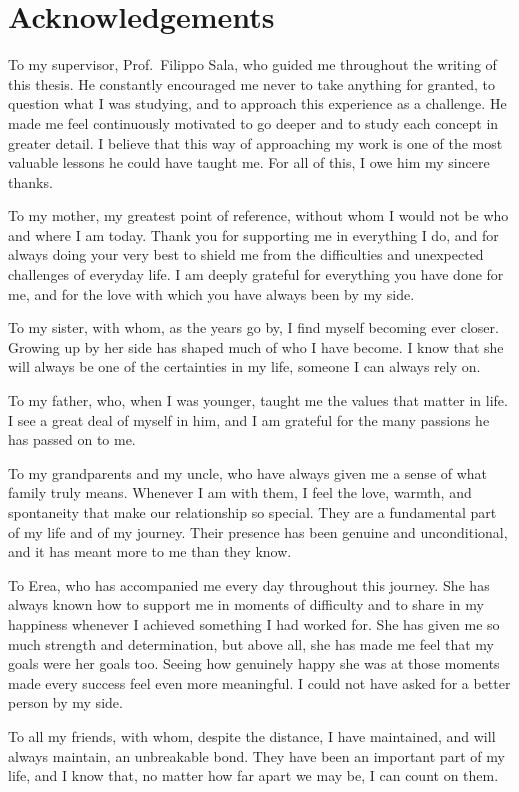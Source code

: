 \chapter*{Acknowledgements}


To my supervisor, Prof.~Filippo Sala, who guided me throughout the writing of this thesis. He constantly encouraged me never to take anything for granted, to question what I was studying, and to approach this experience as a challenge. He made me feel continuously motivated to go deeper and to study each concept in greater detail. I believe that this way of approaching my work is one of the most valuable lessons he could have taught me. For all of this, I owe him my sincere thanks.

To my mother, my greatest point of reference, without whom I would not be who and where I am today. Thank you for supporting me in everything I do, and for always doing your very best to shield me from the difficulties and unexpected challenges of everyday life. I am deeply grateful for everything you have done for me, and for the love with which you have always been by my side.

To my sister, with whom, as the years go by, I find myself becoming ever closer. Growing up by her side has shaped much of who I have become. I know that she will always be one of the certainties in my life, someone I can always rely on.

To my father, who, when I was younger, taught me the values that matter in life. I see a great deal of myself in him, and I am grateful for the many passions he has passed on to me.

To my grandparents and my uncle, who have always given me a sense of what family truly means. Whenever I am with them, I feel the love, warmth, and spontaneity that make our relationship so special. They are a fundamental part of my life and of my journey. Their presence has been genuine and unconditional, and it has meant more to me than they know.

To Erea, who has accompanied me every day throughout this journey. She has always known how to support me in moments of difficulty and to share in my happiness whenever I achieved something I had worked for. She has given me so much strength and determination, but above all, she has made me feel that my goals were her goals too. Seeing how genuinely happy she was at those moments made every success feel even more meaningful. I could not have asked for a better person by my side.

To all my friends, with whom, despite the distance, I have maintained, and will always maintain, an unbreakable bond. They have been an important part of my life, and I know that, no matter how far apart we may be, I can count on them.
